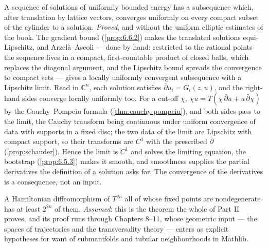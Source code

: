 \begin{theorem}
  \label{thm:6.5.4}
  \leanok
  A sequence of solutions of uniformly bounded energy has a subsequence which,
  after translation by lattice vectors, converges uniformly on every compact
  subset of the cylinder to a solution.  \emph{Proved}, and without the uniform
  elliptic estimates of the book.  The gradient bound (\ref{prop:6.6.2}) makes
  the translated solutions equi-Lipschitz, and Arzel\`a--Ascoli --- done by
  hand: restricted to the rational points the sequence lives in a compact,
  first-countable product of closed balls, which replaces the diagonal
  argument, and the Lipschitz bound spreads the convergence to compact sets ---
  gives a locally uniformly convergent subsequence with a Lipschitz limit.  Read
  in $\mathbb{C}^n$, each solution satisfies $\bar\partial u_i = G_i(z,u)$, and
  the right-hand sides converge locally uniformly too.  For a cut-off $\chi$,
  $\chi u = T(\chi\,\bar\partial u + u\,\bar\partial\chi)$ by the
  Cauchy--Pompeiu formula (\ref{thm:cauchy-pompeiu}), and both sides pass to the
  limit, the Cauchy transform being continuous under uniform convergence of
  data with supports in a fixed disc; the two data of the limit are Lipschitz
  with compact support, so their transforms are $C^1$ with the prescribed
  $\bar\partial$ (\ref{prop:schauder}).  Hence the limit is $C^1$ and solves the
  limiting equation, the bootstrap (\ref{prop:6.5.3}) makes it smooth, and
  smoothness supplies the partial derivatives the definition of a solution asks
  for.  The convergence of the derivatives is a consequence, not an input.
\end{theorem}

\begin{theorem}
  \label{thm:6.1.2}
  \notready
  A Hamiltonian diffeomorphism of $T^{2n}$ all of whose fixed points are
  nondegenerate has at least $2^{2n}$ of them.  \emph{Assumed}: this is the
  theorem the whole of Part II proves, and its proof runs through Chapters
  8--11, whose geometric input --- the spaces of trajectories and the
  transversality theory --- enters as explicit hypotheses for want of
  submanifolds and tubular neighbourhoods in Mathlib.
\end{theorem}


